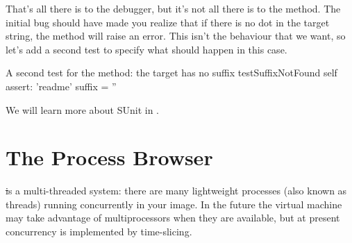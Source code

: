 \documentclass[a4paper,10pt,twoside]{book}
\begin{document}
That's all there is to the debugger, but it's not all there is to the  method.  
The initial bug should have made you realize that if there is no dot in the target string, the  method will raise an error.  
This isn't the behaviour that we want, so let's add a second test to specify what should happen in this case.

\begin{method}[testNoSuffix]{A second test for the  method: the target has no suffix}
testSuffixNotFound
	self assert: 'readme' suffix = ''
\end{method}



We will learn more about SUnit in .


\section{The Process Browser}

\st is a multi-threaded system: there are many lightweight processes (also known as threads) running concurrently in your image. 
In the future the \sq virtual machine may take advantage of multiprocessors when they are available, but at present concurrency is implemented by time-slicing.
\end{document}
